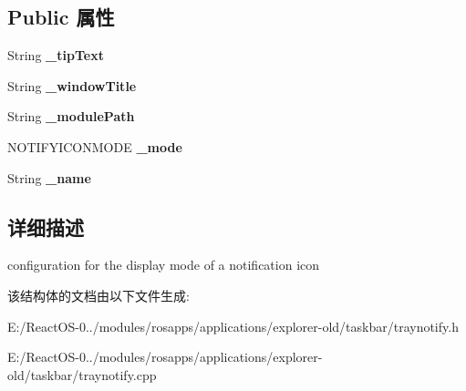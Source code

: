 \subsection*{Public 属性}
\begin{DoxyCompactItemize}
\item 
\mbox{\label{struct_notify_icon_config_adb61e043d38c1194e8b860ca32b0a447}} 
String {\bfseries \+\_\+tip\+Text}
\item 
\mbox{\label{struct_notify_icon_config_a5ba2b4eab5def4786a4a56d3a0f6a1c4}} 
String {\bfseries \+\_\+window\+Title}
\item 
\mbox{\label{struct_notify_icon_config_a9296723c3ca2ae568227c74db365ec3b}} 
String {\bfseries \+\_\+module\+Path}
\item 
\mbox{\label{struct_notify_icon_config_aef40b8ff32e406c5469d4ddbd5b8ab25}} 
N\+O\+T\+I\+F\+Y\+I\+C\+O\+N\+M\+O\+DE {\bfseries \+\_\+mode}
\item 
\mbox{\label{struct_notify_icon_config_a8b460141e54eedf760800711e28d1cbb}} 
String {\bfseries \+\_\+name}
\end{DoxyCompactItemize}


\subsection{详细描述}
configuration for the display mode of a notification icon 

该结构体的文档由以下文件生成\+:\begin{DoxyCompactItemize}
\item 
E\+:/\+React\+O\+S-\/0../modules/rosapps/applications/explorer-\/old/taskbar/traynotify.\+h\item 
E\+:/\+React\+O\+S-\/0../modules/rosapps/applications/explorer-\/old/taskbar/traynotify.\+cpp\end{DoxyCompactItemize}
